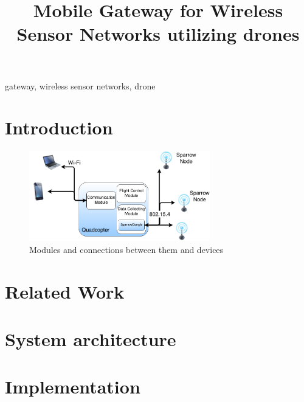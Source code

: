 \documentclass[conference]{IEEEtran}
\begin{document}
\title{Mobile Gateway for Wireless Sensor Networks utilizing drones}

\author{
  }

 
\maketitle

\begin{abstract} 

\end{abstract}

\begin{IEEEkeywords}
gateway, wireless sensor networks, drone
\end{IEEEkeywords}

\section{Introduction}
\label{sec:introduction}


\begin{figure}[ht] \centering
\includegraphics[width=0.7\textwidth]{img/organigrama.png}
\caption{Modules and connections between them and devices} \end{figure}
\section{Related Work}
\label{sec:related}


\section{System architecture}
\label{sec:architecture}


\section{Implementation}
\label{sec:implementation}

\end{document}
